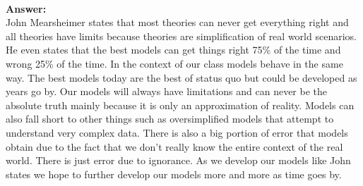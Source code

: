 \documentclass[12pt]{article}
\begin{document}
\begin{enumerate}
 \\
\textbf{Answer: } \\ 
John Mearsheimer states that most theories can never get everything right and all theories have limits because theories are simplification of real world scenarios. He even states that the best models can get things right 75\% of the time and wrong 25\% of the time. In the context of our class models behave in the same way. The best models today are the best of status quo but could be developed as years go by. Our models will always have limitations and can never be the absolute truth mainly because it is only an approximation of reality. Models can also fall short to other things such as oversimplified models that attempt to understand very complex data. There is also a big portion of error that models obtain due to the fact that we don't really know the entire context of the real world. There is just error due to ignorance. As we develop our models like John states we hope to further develop our models more and more as time goes by.

\end{enumerate}
\end{document}
